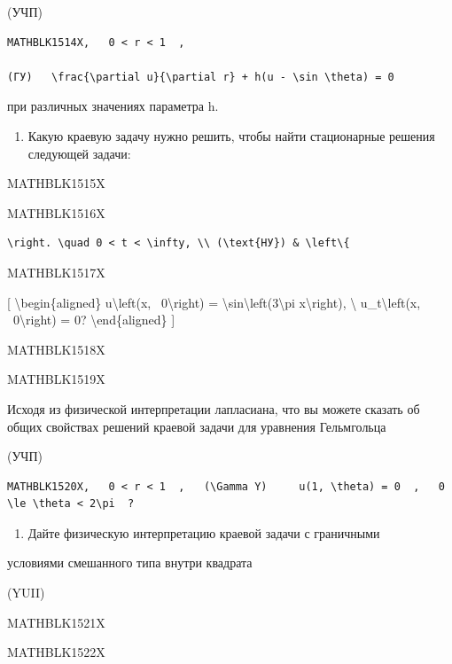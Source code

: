 \documentclass[
]{article}
\providecommand{\tightlist}{%
  \setlength{\itemsep}{0pt}\setlength{\parskip}{0pt}}
\begin{document}
(УЧП)

\begin{verbatim}
MATHBLK1514X,   0 < r < 1  ,

(ГУ)   \frac{\partial u}{\partial r} + h(u - \sin \theta) = 0
\end{verbatim}

при различных значениях параметра h.

\begin{enumerate}
\def\labelenumi{\arabic{enumi}.}
\setcounter{enumi}{3}
\tightlist
\item
  Какую краевую задачу нужно решить, чтобы найти стационарные решения
  следующей задачи:
\end{enumerate}

MATHBLK1515X

MATHBLK1516X

\begin{verbatim}
\right. \quad 0 < t < \infty, \\ (\text{НУ}) & \left\{
\end{verbatim}

MATHBLK1517X

{[} \textbackslash begin\{aligned\} u\textbackslash left(x,
~0\textbackslash right) =
\textbackslash sin\textbackslash left(3\textbackslash pi
x\textbackslash right), \textbackslash{} u\_t\textbackslash left(x,
~0\textbackslash right) = 0? \textbackslash end\{aligned\} {]}

MATHBLK1518X

MATHBLK1519X

Исходя из физической интерпретации лапласиана, что вы можете сказать об
общих свойствах решений краевой задачи для уравнения Гельмгольца

(УЧП)

\begin{verbatim}
MATHBLK1520X,   0 < r < 1  ,   (\Gamma Y)     u(1, \theta) = 0  ,   0 \le \theta < 2\pi  ?
\end{verbatim}

\begin{enumerate}
\def\labelenumi{\arabic{enumi}.}
\setcounter{enumi}{5}
\tightlist
\item
  Дайте физическую интерпретацию краевой задачи с граничными
\end{enumerate}

условиями смешанного типа внутри квадрата

(YUII)

MATHBLK1521X

MATHBLK1522X
\end{document}
